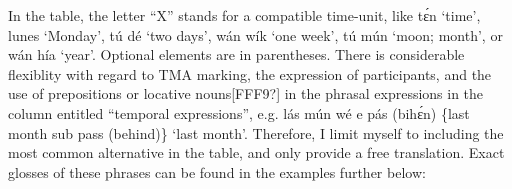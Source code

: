In the table, the letter “X” stands for a compatible time-unit, like tɛ́n ‘time’, lunes ‘Monday’, tú dé ‘two days’, wán wík ‘one week’, tú mún ‘moon; month’, or wán hía ‘year’. Optional elements are in parentheses. There is considerable flexiblity with regard to TMA marking, the expression of participants, and the use of prepositions or locative nouns[FFF9?] in the phrasal expressions in the column entitled “temporal expressions”, e.g. lás mún wé e pás (bihɛ́n) \{last month sub pass (behind)\} ‘last month’. Therefore, I limit myself to including the most common alternative in the table, and only provide a free translation. Exact glosses of these phrases can be found in the examples further below:


